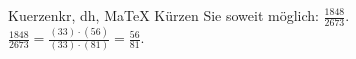 \begin{MAufgabe}{Kuerzen}{kr, dh, MaTeX}
K\"urzen Sie soweit m\"oglich: $\frac{1848}{2673}$.\\ 
\ifLsg\MLoesung
\quad $\frac{1848}{2673}=\frac{(33)\cdot(56)}{(33)\cdot(81)}=\frac{56}{81}$.\else\relax\fi
 \end{MAufgabe}